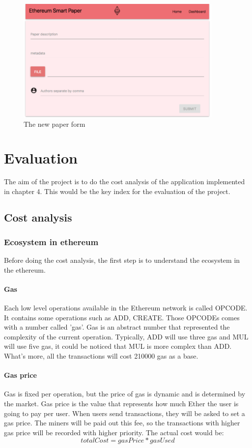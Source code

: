 \documentclass[openany,12pt]{ecsthesis}      %
\begin{document}
\begin{figure}[H]
  \centering
  \includegraphics[width=0.9\textwidth]{app2.png}
  \caption{The new paper form}
  \label{form}
\end{figure}
\chapter{Evaluation}
The aim of the project is to do the cost analysis of the application implemented in chapter 4.
This would be the key index for the evaluation of the project.
\section{Cost analysis}
\subsection{Ecosystem in ethereum}
Before doing the cost analysis, the first step is to understand the ecosystem in the ethereum.
\subsubsection{Gas}
Each low level operations available in the Ethereum network is called OPCODE. It contains some operations such as ADD, CREATE.
Those OPCODEs comes with a number called 'gas'. Gas is an abstract number that represented the complexity of the current operation.
Typically, ADD will use three gas and MUL will use five gas, it could be noticed that MUL is more complex than ADD. What's more, 
all the transactions will cost 210000 gas as a base.
\subsubsection{Gas price}
Gas is fixed per operation, but the price of gas is dynamic and is determined by the market. 
Gas price is the value that represents how much Ether the user is going to pay per user. When users send transactions, they will be asked to set a gas price.
The miners will be paid out this fee, so the transactions with higher gas price will be recorded with higher priority. The actual cost would be:
\begin{equation}
  totalCost = gasPrice * gasUsed
\end{equation}
\end{document}
